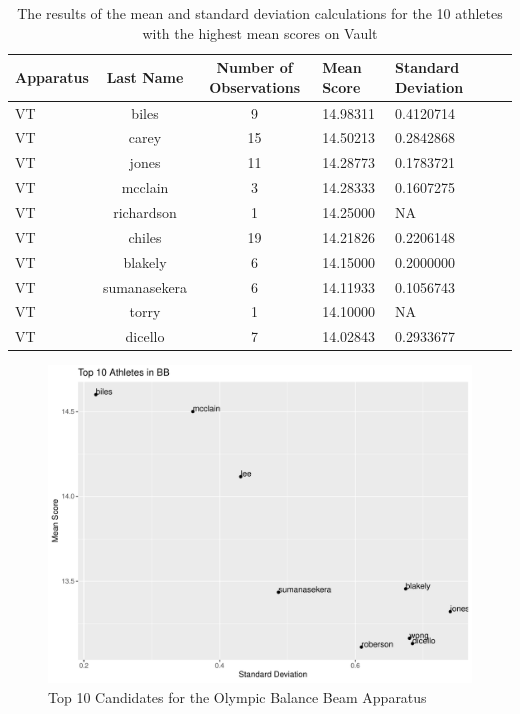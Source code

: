 \documentclass[12pt]{article}
\begin{document}
 \begin{table}[tbp]
  \caption{The results of the mean and standard deviation calculations for the 10 athletes with the highest 
  mean scores on Vault}
  \label{tab:tableVT}
\centering
\begin{tabular}[t]{lccllll}
 \toprule
  Apparatus & Last Name & Number of Observations & Mean Score & Standard Deviation\\
  \midrule
  VT & biles & 9 & 14.98311 & 0.4120714\\
  \midrule
  VT & carey & 15 & 14.50213 & 0.2842868\\
  \midrule
  VT & jones & 11 & 14.28773 & 0.1783721\\
  \midrule
  VT & mcclain & 3 & 14.28333 & 0.1607275\\
  \midrule
  VT & richardson & 1 & 14.25000 & NA\\
  \midrule
  VT & chiles & 19 & 14.21826 & 0.2206148\\
  \midrule
  VT & blakely & 6 & 14.15000 & 0.2000000\\
  \midrule
  VT & sumanasekera & 6 & 14.11933 & 0.1056743\\
  \midrule
  VT & torry & 1 & 14.10000 & NA\\
  \midrule
  VT & dicello & 7 & 14.02843 & 0.2933677\\
   \bottomrule
\end{tabular}
\end{table}



\begin{figure}[tbp]
  \centering
  \includegraphics[scale=0.6]{Top10AthletesBB.pdf}
  \caption{Top 10 Candidates for the Olympic Balance Beam Apparatus}
  \label{fig:BB}
\end{figure}
\end{document}
